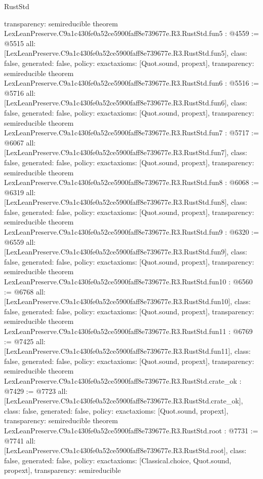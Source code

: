 \begin{lexlean}{RustStd}
\begin{coremodule}
{  transparency: semireducible
}
theorem LexLeanPreserve.C9a1c430fe0a52ce5900faff8e739677e.R3.RustStd.fun5 : @4559 := @5515 {
  all: [LexLeanPreserve.C9a1c430fe0a52ce5900faff8e739677e.R3.RustStd.fun5],
  class: false,
  generated: false,
  policy: exact{axioms: [Quot.sound, propext]},
  transparency: semireducible
}
theorem LexLeanPreserve.C9a1c430fe0a52ce5900faff8e739677e.R3.RustStd.fun6 : @5516 := @5716 {
  all: [LexLeanPreserve.C9a1c430fe0a52ce5900faff8e739677e.R3.RustStd.fun6],
  class: false,
  generated: false,
  policy: exact{axioms: [Quot.sound, propext]},
  transparency: semireducible
}
theorem LexLeanPreserve.C9a1c430fe0a52ce5900faff8e739677e.R3.RustStd.fun7 : @5717 := @6067 {
  all: [LexLeanPreserve.C9a1c430fe0a52ce5900faff8e739677e.R3.RustStd.fun7],
  class: false,
  generated: false,
  policy: exact{axioms: [Quot.sound, propext]},
  transparency: semireducible
}
theorem LexLeanPreserve.C9a1c430fe0a52ce5900faff8e739677e.R3.RustStd.fun8 : @6068 := @6319 {
  all: [LexLeanPreserve.C9a1c430fe0a52ce5900faff8e739677e.R3.RustStd.fun8],
  class: false,
  generated: false,
  policy: exact{axioms: [Quot.sound, propext]},
  transparency: semireducible
}
theorem LexLeanPreserve.C9a1c430fe0a52ce5900faff8e739677e.R3.RustStd.fun9 : @6320 := @6559 {
  all: [LexLeanPreserve.C9a1c430fe0a52ce5900faff8e739677e.R3.RustStd.fun9],
  class: false,
  generated: false,
  policy: exact{axioms: [Quot.sound, propext]},
  transparency: semireducible
}
theorem LexLeanPreserve.C9a1c430fe0a52ce5900faff8e739677e.R3.RustStd.fun10 : @6560 := @6768 {
  all: [LexLeanPreserve.C9a1c430fe0a52ce5900faff8e739677e.R3.RustStd.fun10],
  class: false,
  generated: false,
  policy: exact{axioms: [Quot.sound, propext]},
  transparency: semireducible
}
theorem LexLeanPreserve.C9a1c430fe0a52ce5900faff8e739677e.R3.RustStd.fun11 : @6769 := @7425 {
  all: [LexLeanPreserve.C9a1c430fe0a52ce5900faff8e739677e.R3.RustStd.fun11],
  class: false,
  generated: false,
  policy: exact{axioms: [Quot.sound, propext]},
  transparency: semireducible
}
theorem LexLeanPreserve.C9a1c430fe0a52ce5900faff8e739677e.R3.RustStd.crate_ok : @7429 := @7723 {
  all: [LexLeanPreserve.C9a1c430fe0a52ce5900faff8e739677e.R3.RustStd.crate_ok],
  class: false,
  generated: false,
  policy: exact{axioms: [Quot.sound, propext]},
  transparency: semireducible
}
theorem LexLeanPreserve.C9a1c430fe0a52ce5900faff8e739677e.R3.RustStd.root : @7731 := @7741 {
  all: [LexLeanPreserve.C9a1c430fe0a52ce5900faff8e739677e.R3.RustStd.root],
  class: false,
  generated: false,
  policy: exact{axioms: [Classical.choice, Quot.sound, propext]},
  transparency: semireducible
}


\end{coremodule}
\end{lexlean}
